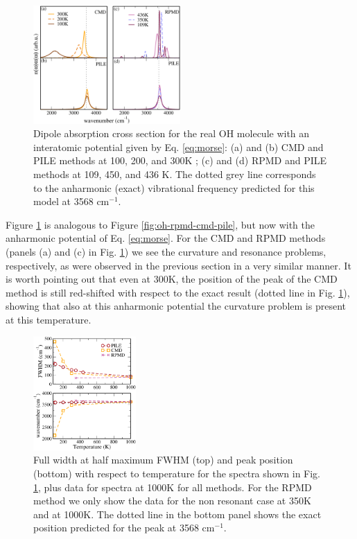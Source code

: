 \documentclass[aps,prb,superscriptaddress,amsmath,amssymb,showpacs,twocolumn]{revtex4}
\begin{document}
\begin{figure}[htbp]
\centering
\includegraphics[width=0.5\textwidth]{figures/comparison_ohanharm_factors.pdf}
\caption{Dipole absorption cross section for the real OH molecule  with an interatomic potential given by Eq. \ref{eq:morse}: (a) and (b) CMD and PILE methods at 100, 200, 
and 300K ; (c)  and (d) RPMD and PILE methods at 109, 450, and 436 K. The dotted grey line corresponds to the 
anharmonic (exact) vibrational frequency predicted for this model at 3568 cm$^{-1}$.}
\label{fig:ohreal-rpmd-cmd-pile}
\end{figure}


Figure \ref{fig:ohreal-rpmd-cmd-pile} is analogous to Figure \ref{fig:oh-rpmd-cmd-pile}, but now with the anharmonic potential of Eq. \ref{eq:morse}. For the CMD and RPMD methods (panels (a) and (c) in Fig.  \ref{fig:ohreal-rpmd-cmd-pile}) we
see the curvature and resonance problems, respectively, as were observed in the previous section in a very similar manner. It is worth pointing out that even at 300K, the position of the peak of the CMD method is still red-shifted with respect to the exact result (dotted line in Fig. \ref{fig:ohreal-rpmd-cmd-pile}), showing that also at this anharmonic potential the curvature problem is present at this temperature. 

\begin{figure}[htbp]
\centering
\includegraphics[width=0.35\textwidth]{figures/ohreal_positionbroad.pdf}
\caption{Full width at half maximum FWHM (top) and peak position (bottom) with respect to temperature for the spectra shown in Fig. \ref{fig:ohreal-rpmd-cmd-pile}, plus data for spectra at 1000K for all methods. For the RPMD method we only show the data for the non resonant case at 350K and at 1000K. The dotted line in the bottom panel shows the exact position predicted for the peak at 3568 cm$^{-1}$.}
\label{fig:ohreal-position-broad}
\end{figure}
\end{document}
